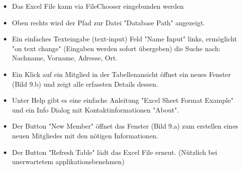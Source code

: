 \documentclass{article}
\begin{document}
\begin{itemize}

		\item Das Excel File kann via FileChooser eingebunden werden
		\item Oben rechts wird der Pfad zur Datei "Database Path" angezeigt.
		\item Ein einfaches Texteingabe (text-input) Feld "Name Input" links, ermöglicht "on text change" (Eingaben werden sofort übergeben) die Suche nach: Nachname, Vorname, Adresse, Ort.
		\item Ein Klick auf ein Mitglied in der Tabellenansicht öffnet ein neues Fenster (Bild 9.b) und zeigt alle erfassten Details dessen.
		\item Unter Help gibt es eine einfache Anleitung "Excel Sheet Format Example" und ein Info Dialog mit Kontaktinformationen "About".
		\item Der Button "New Member" öffnet das Fenster (Bild 9.a) zum erstellen eines neuen Mitgliedes mit den nötigen Informationen.
		\item Der Button "Refresh Table" lädt das Excel File erneut. (Nützlich bei unerwartetem applikationsbenehmen)
	 \end{itemize}

\newpage

\end{document}
